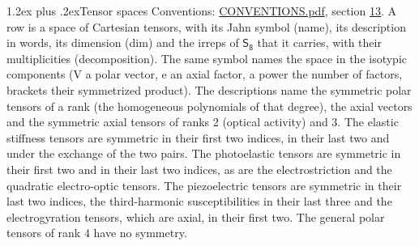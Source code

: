 \documentclass[10pt,a4paper]{article}
\makeatletter
\renewcommand\section{\@startsection{section}{1}{\z@}{-3ex plus -1ex minus -.2ex}%
  {1.2ex plus .2ex}{\normalfont\large\sffamily\bfseries\color{parttitle}}}
\numberwithin{equation}{section}
\newcommand{\grp}[1]{\mathsf{#1}}
\makeatother
\begin{document}
\section{Tensor spaces}\label{s:tensor_spaces}
Conventions: \href{../../CONVENTIONS.pdf}{CONVENTIONS.pdf}, section \href{../../CONVENTIONS.pdf\#conv.13}{13}.
\leavevmode\label{n:head.name}\label{n:head.description}\label{n:head.dim}\label{n:head.decomposition}A row is a space of Cartesian tensors, with its Jahn symbol (name), its description in words, its dimension (dim) and the irreps of $\grp{S_{8}}$ that it carries, with their multiplicities (decomposition). \label{n:label.jahn}The same symbol names the space in the isotypic components (V a polar vector, e an axial factor, a power the number of factors, brackets their symmetrized product). The descriptions name the symmetric polar tensors of a rank (the homogeneous polynomials of that degree), the axial vectors and the symmetric axial tensors of ranks 2 (optical activity) and 3. The elastic stiffness tensors are symmetric in their first two indices, in their last two and under the exchange of the two pairs. The photoelastic tensors are symmetric in their first two and in their last two indices, as are the electrostriction and the quadratic electro-optic tensors. The piezoelectric tensors are symmetric in their last two indices, the third-harmonic susceptibilities in their last three and the electrogyration tensors, which are axial, in their first two. The general polar tensors of rank 4 have no symmetry.
\end{document}
